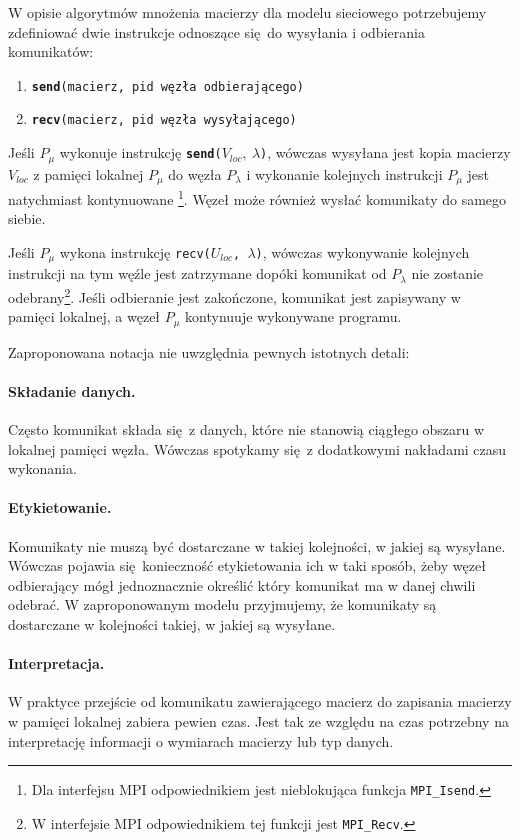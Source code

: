 W opisie algorytmów mnożenia macierzy dla modelu sieciowego potrzebujemy zdefiniować dwie instrukcje odnoszące się do wysyłania i odbierania komunikatów:
\begin{enumerate}
 \item \texttt{\textbf{send}({macierz}, {pid węzła odbierającego})}
 \item \texttt{\textbf{recv}({macierz}, {pid węzła wysyłającego})}
\end{enumerate}

Jeśli \(P_\mu\) wykonuje instrukcję \texttt{\textbf{send}(}\(V_{loc},\:\lambda\)\texttt{)}, wówczas wysyłana jest kopia macierzy \(V_{loc}\) z pamięci lokalnej \(P_\mu\) do węzła \(P_\lambda\) i wykonanie kolejnych instrukcji \(P_\mu\) jest natychmiast kontynuowane \footnote{Dla interfejsu MPI odpowiednikiem jest nieblokująca funkcja \texttt{MPI\_Isend}.}. Węzeł może również wysłać komunikaty do samego siebie.


Jeśli \(P_\mu\) wykona instrukcję \texttt{recv(\(U_{loc}\), \(\lambda\))}, wówczas wykonywanie kolejnych instrukcji na tym węźle jest zatrzymane dopóki komunikat od \(P_\lambda\) nie zostanie odebrany\footnote{W interfejsie MPI odpowiednikiem tej funkcji jest \texttt{MPI\_Recv}.}. Jeśli odbieranie jest zakończone, komunikat jest zapisywany w pamięci lokalnej, a węzeł \(P_\mu\) kontynuuje wykonywane programu.

\begin{uwaga}
Zaproponowana notacja nie uwzględnia pewnych istotnych detali:

\paragraph{Składanie danych.} Często komunikat składa się z danych, które nie stanowią ciągłego obszaru w lokalnej pamięci węzła. Wówczas spotykamy się z dodatkowymi nakładami czasu wykonania.
\paragraph{Etykietowanie.} Komunikaty nie muszą być dostarczane w takiej kolejności, w jakiej są wysyłane. Wówczas pojawia się konieczność etykietowania ich w taki sposób, żeby węzeł odbierający mógł jednoznacznie określić który komunikat ma w danej chwili odebrać. W zaproponowanym modelu przyjmujemy, że komunikaty są dostarczane w kolejności takiej, w jakiej są wysyłane.
\paragraph{Interpretacja.} W praktyce przejście od komunikatu zawierającego macierz do zapisania macierzy w pamięci lokalnej zabiera pewien czas. Jest tak ze względu na czas potrzebny na interpretację informacji o wymiarach macierzy lub typ danych.
\end{uwaga}



